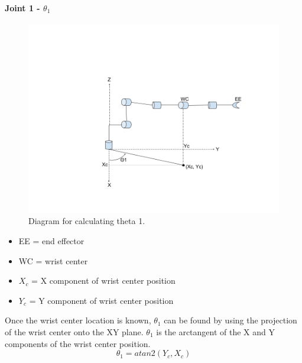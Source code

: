 \documentclass{article}
\begin{document}
\paragraph{Joint 1 - $\theta _1$}
\begin{figure}[H]
    \includegraphics[width=\linewidth]{theta1.png}
    \caption{Diagram for calculating theta 1.}
    \label{fig:theta3}
\end{figure}
\begin{itemize}
    \item EE = end effector
    \item WC = wrist center
    \item $X_c$ = X component of wrist center position
    \item $Y_c$ = Y component of wrist center position
\end{itemize}
Once the wrist center location is known, $\theta _1$ can be found by using the projection of the wrist center onto the XY plane. $\theta _1$ is the arctangent of the X and Y components of the wrist center position.
\[\theta _1 = atan2(Y_c, X_c)\]
\end{document}
